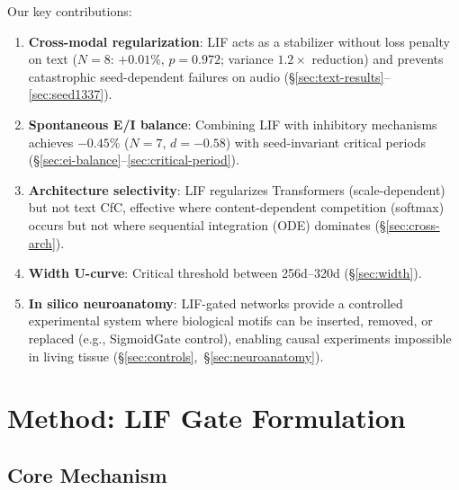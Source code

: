 \documentclass[11pt]{article}
\begin{document}
Our key contributions:
\begin{enumerate}
    \item \textbf{Cross-modal regularization}: LIF acts as a stabilizer without loss penalty on text ($N{=}8$: $+0.01\%$, $p = 0.972$; variance $1.2\times$ reduction) and prevents catastrophic seed-dependent failures on audio (\S\ref{sec:text-results}--\ref{sec:seed1337}).
    \item \textbf{Spontaneous E/I balance}: Combining LIF with inhibitory mechanisms achieves $-0.45\%$ ($N{=}7$, $d{=}-0.58$) with seed-invariant critical periods (\S\ref{sec:ei-balance}--\ref{sec:critical-period}).
    \item \textbf{Architecture selectivity}: LIF regularizes Transformers (scale-dependent) but not text CfC, effective where content-dependent competition (softmax) occurs but not where sequential integration (ODE) dominates (\S\ref{sec:cross-arch}).
    \item \textbf{Width U-curve}: Critical threshold between 256d--320d (\S\ref{sec:width}).
    \item \textbf{In silico neuroanatomy}: LIF-gated networks provide a controlled experimental system where biological motifs can be inserted, removed, or replaced (e.g., SigmoidGate control), enabling causal experiments impossible in living tissue (\S\ref{sec:controls},~\S\ref{sec:neuroanatomy}).
\end{enumerate}


\section{Method: LIF Gate Formulation}
\label{sec:method}

\subsection{Core Mechanism}
\end{document}
